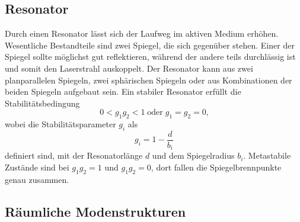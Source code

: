 \subsection{Resonator}
Durch einen Resonator lässt sich der Laufweg im aktiven Medium erhöhen. Wesentliche Bestandteile sind zwei Spiegel, die sich gegenüber stehen.
Einer der Spiegel sollte möglichst gut reflektieren, während der andere teils durchlässig ist und somit den Laserstrahl auskoppelt.
Der Resonator kann aus zwei planparallelen Spiegeln, zwei sphärischen Spiegeln oder aus Kombinationen der beiden Spiegeln aufgebaut sein.
Ein stabiler Resonator erfüllt die Stabilitätsbedingung
\begin{equation}
    0 < g_1 g_2 < 1 \; \text{oder} \; g_1 = g_2 = 0 \text{,}
    \label{eqn:stabi}
\end{equation}
wobei die Stabilitätsparameter $g_i$ als
\begin{equation}
    g_i = 1 - \frac{d}{b_i}
    \label{eqn:Stabilitätsparameter}
\end{equation}
definiert sind, mit der Resonatorlänge $d$ und dem Spiegelradius $b_i$.
Metastabile Zustände sind bei $g_1 g_2 = 1$ und $g_1 g_2 = 0$, dort fallen die Spiegelbrennpunkte genau zusammen.

\subsection{Räumliche Modenstrukturen}

